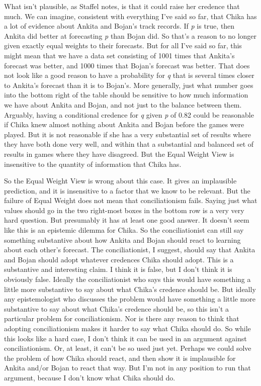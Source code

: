 \documentclass[
  10pt,
  letterpaper,
  twoside]{scrbook}
\begin{document}
What isn't plausible, as Staffel notes, is that it could raise her
credence that much. We can imagine, consistent with everything I've said
so far, that {Chika} has a lot of evidence about {Ankita} and {Bojan}'s
track records. If \emph{p} is true, then {Ankita} did better at
forecasting \emph{p} than {Bojan} did. So that's a reason to no longer
given exactly equal weights to their forecasts. But for all I've said so
far, this might mean that we have a data set consisting of 1001 times
that {Ankita}'s forecast was better, and 1000 times that {Bojan}'s
forecast was better. That does not look like a good reason to have a
probability for \emph{q} that is several times closer to {Ankita}'s
forecast than it is to {Bojan}'s. More generally, just what number goes
into the bottom right of the table should be sensitive to how much
information we have about {Ankita} and {Bojan}, and not just to the
balance between them. Arguably, having a conditional credence for
\emph{q} given \emph{p} of 0.82 could be reasonable if {Chika} knew
almost nothing about {Ankita} and {Bojan} before the games were played.
But it is not reasonable if she has a very substantial set of results
where they have both done very well, and within that a substantial and
balanced set of results in games where they have disagreed. But the
Equal Weight View is insensitive to the quantity of information that
{Chika} has.

So the Equal Weight View is wrong about this case. It gives an
implausible prediction, and it is insensitive to a factor that we know
to be relevant. But the failure of Equal Weight does not mean that
conciliationism fails. Saying just what values should go in the two
right-most boxes in the bottom row is a very very hard question. But
presumably it has at least one good answer. It doesn't seem like this is
an epistemic dilemma for {Chika}. So the conciliationist can still say
something substantive about how {Ankita} and {Bojan} should react to
learning about each other's forecast. The conciliationist, I suggest,
should say that {Ankita} and {Bojan} should adopt whatever credences
{Chika} should adopt. This is a substantive and interesting claim. I
think it is false, but I don't think it is obviously false. Ideally the
conciliationist who says this would have something a little more
substantive to say about what {Chika}'s credence should be. But ideally
any epistemologist who discusses the problem would have something a
little more substantive to say about what {Chika}'s credence should be,
so this isn't a particular problem for conciliationism. Nor is there any
reason to think that adopting conciliationism makes it harder to say
what {Chika} should do. So while this looks like a hard case, I don't
think it can be used in an argument against conciliationism. Or, at
least, it can't be so used just yet. Perhaps we could solve the problem
of how {Chika} should react, and then show it is implausible for
{Ankita} and/or {Bojan} to react that way. But I'm not in any position
to run that argument, because I don't know what {Chika} should do.
\end{document}
